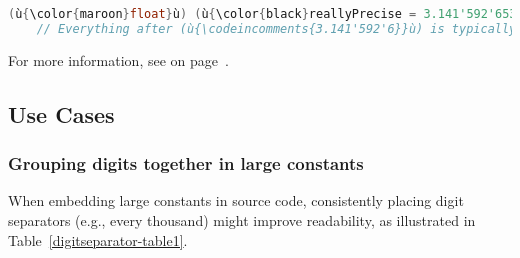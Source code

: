\begin{lstlisting}[language=C++]
(ù{\color{maroon}float}ù) (ù{\color{black}reallyPrecise = 3.141'592'653'589'793'238'462'643'383'279'502'884;}ù)  // OK
    // Everything after (ù{\codeincomments{3.141'592'6}}ù) is typically ignored silently.
\end{lstlisting}
    
\noindent For more information, see {\it{}} on page~\pageref{appendix:-silent-loss-of-precision-in-floating-point-literals}.

\subsection[Use Cases]{Use Cases}\label{use-cases}

\subsubsection[Grouping digits together in large constants]{Grouping digits together in large constants}\label{grouping-digits-together-in-large-constants}

When embedding large constants in source code, consistently placing
digit separators (e.g., every thousand) might improve readability, as
illustrated in Table~\ref{digitseparator-table1}.


